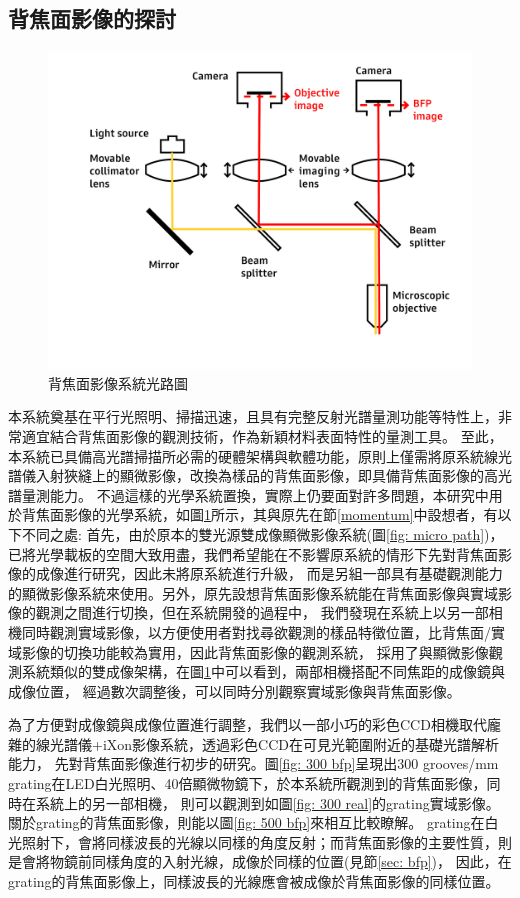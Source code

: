 \documentclass[12pt]{article}
\begin{document}
\subsection{背焦面影像的探討}
\begin{figure}
    \centering
    \includegraphics[width = 0.9\linewidth]{lightPath3.jpg}
    \caption{背焦面影像系統光路圖}
    \label{fig: bfp path}
\end{figure}
本系統奠基在平行光照明、掃描迅速，且具有完整反射光譜量測功能等特性上，非常適宜結合背焦面影像的觀測技術，作為新穎材料表面特性的量測工具。
至此，本系統已具備高光譜掃描所必需的硬體架構與軟體功能，原則上僅需將原系統線光譜儀入射狹縫上的顯微影像，改換為樣品的背焦面影像，即具備背焦面影像的高光譜量測能力。
不過這樣的光學系統置換，實際上仍要面對許多問題，本研究中用於背焦面影像的光學系統，如圖\ref{fig: bfp path}所示，其與原先在節\ref{momentum}中設想者，有以下不同之處:
首先，由於原本的雙光源雙成像顯微影像系統(圖\ref{fig: micro path})，已將光學載板的空間大致用盡，我們希望能在不影響原系統的情形下先對背焦面影像的成像進行研究，因此未將原系統進行升級，
而是另組一部具有基礎觀測能力的顯微影像系統來使用。另外，原先設想背焦面影像系統能在背焦面影像與實域影像的觀測之間進行切換，但在系統開發的過程中，
我們發現在系統上以另一部相機同時觀測實域影像，以方便使用者對找尋欲觀測的樣品特徵位置，比背焦面/實域影像的切換功能較為實用，因此背焦面影像的觀測系統，
採用了與顯微影像觀測系統類似的雙成像架構，在圖\ref{fig: bfp path}中可以看到，兩部相機搭配不同焦距的成像鏡與成像位置，
經過數次調整後，可以同時分別觀察實域影像與背焦面影像。

為了方便對成像鏡與成像位置進行調整，我們以一部小巧的彩色CCD相機取代龐雜的線光譜儀+iXon影像系統，透過彩色CCD在可見光範圍附近的基礎光譜解析能力，
先對背焦面影像進行初步的研究。圖\ref{fig: 300 bfp}呈現出300 grooves/mm grating在LED白光照明、40倍顯微物鏡下，於本系統所觀測到的背焦面影像，同時在系統上的另一部相機，
則可以觀測到如圖\ref{fig: 300 real}的grating實域影像。關於grating的背焦面影像，則能以圖\ref{fig: 500 bfp}來相互比較瞭解。
grating在白光照射下，會將同樣波長的光線以同樣的角度反射；而背焦面影像的主要性質，則是會將物鏡前同樣角度的入射光線，成像於同樣的位置(見節\ref{sec: bfp})，
因此，在grating的背焦面影像上，同樣波長的光線應會被成像於背焦面影像的同樣位置。\cite{inproceedings}
\end{document}
